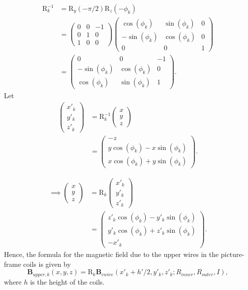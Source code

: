 \documentclass{article}
\begin{document}
\[\begin{aligned}
    \text{R}^{-1}_k &= \text{R}_y(-\pi/2)\text{R}_z(-\phi_k) \\
    &= \begin{pmatrix}
        0 & 0 & -1 \\
        0 & 1 & 0 \\
        1 & 0 & 0
    \end{pmatrix}
    \begin{pmatrix}
        \cos(\phi_k) & \sin(\phi_k) & 0 \\
        -\sin(\phi_k) & \cos(\phi_k) & 0 \\
        0 & 0 & 1
    \end{pmatrix} \\
    &= \begin{pmatrix}
        0 & 0 & -1 \\
        -\sin(\phi_k) & \cos(\phi_k) & 0 \\
        \cos(\phi_k) & \sin(\phi_k) & 1
    \end{pmatrix}.
\end{aligned}\]
Let 
\[\begin{aligned}
    \begin{pmatrix}
        x'_k \\ y'_k \\ z'_k
    \end{pmatrix} &= \text{R}^{-1}_k
    \begin{pmatrix}
        x \\ y \\ z
    \end{pmatrix} \\
    &= \begin{pmatrix}
        -z \\
        y \cos(\phi_k) - x \sin(\phi_k) \\
        x \cos(\phi_k) + y \sin(\phi_k)
    \end{pmatrix}.
\end{aligned}\]

\[\begin{aligned}
\implies
\begin{pmatrix}
    x \\ y \\ z
\end{pmatrix} &= 
\text{R}_k
\begin{pmatrix}
    x'_k \\ y'_k \\ z'_k
\end{pmatrix} \\
&= \begin{pmatrix}
    z'_k\cos(\phi_k)-y'_k\sin(\phi_k)  \\
    y'_k\cos(\phi_k) +z'_k\sin(\phi_k) \\
    -x'_k
\end{pmatrix}.
\end{aligned}\]
Hence, the formula for the magnetic field due to the upper wires in the 
 picture-frame coils is given by
\[\mathbf{B}_{upper,k}(x,y,z) = \text{R}_k\mathbf{B}_{vwire}(x'_k + h'/2, y'_k, z'_k; R_{inner}, R_{outer}, I),\]
where $h$ is the height of the coils.
\end{document}

